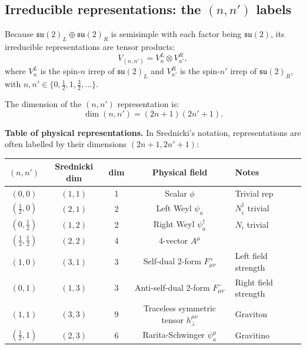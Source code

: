 \documentclass[12pt]{article}
\theoremstyle{remark}
\newcommand{\psidag}{\psi^{\dagger}}
\begin{document}
\subsection{Irreducible representations: the \texorpdfstring{$(n,n')$}{(n,n')} labels}

Because $\mathfrak{su}(2)_L \oplus \mathfrak{su}(2)_R$ is semisimple with
each factor being $\mathfrak{su}(2)$, its irreducible representations
are tensor products:
\begin{equation}
  V_{(n,n')} = V_n^L \otimes V_{n'}^R,
\end{equation}
where $V_n^L$ is the spin-$n$ irrep of $\mathfrak{su}(2)_L$ and
$V_{n'}^R$ is the spin-$n'$ irrep of $\mathfrak{su}(2)_R$,
with $n,n' \in \{0, \tfrac{1}{2}, 1, \tfrac{3}{2}, \ldots\}$.

The dimension of the $(n,n')$ representation is:
\begin{equation}
  \dim(n,n') = (2n+1)(2n'+1).
\end{equation}

\medskip
\noindent\textbf{Table of physical representations.}  In Srednicki's
notation, representations are often labelled by their dimensions
$(2n+1, 2n'+1)$:

\begin{center}
\renewcommand{\arraystretch}{1.45}
\begin{tabular}{@{}ccccl@{}}
  \toprule
  $(n,n')$ & Srednicki dim & dim & Physical field & Notes \\
  \midrule
  $(0,0)$ & $(1,1)$ & 1 & Scalar $\phi$ & Trivial rep \\
  $(\tfrac{1}{2},0)$ & $(2,1)$ & 2 & Left Weyl $\psi_a$ & $N_i^\dagger$ trivial \\
  $(0,\tfrac{1}{2})$ & $(1,2)$ & 2 & Right Weyl $\psidag_{\dot a}$ & $N_i$ trivial \\
  $(\tfrac{1}{2},\tfrac{1}{2})$ & $(2,2)$ & 4 & 4-vector $A^\mu$ & \\
  $(1,0)$ & $(3,1)$ & 3 & Self-dual 2-form $F^+_{\mu\nu}$ & Left field strength \\
  $(0,1)$ & $(1,3)$ & 3 & Anti-self-dual 2-form $F^-_{\mu\nu}$ & Right field strength \\
  $(1,1)$ & $(3,3)$ & 9 & Traceless symmetric tensor $h^{\mu\nu}_\perp$ & Graviton \\
  $(\tfrac{1}{2},1)$ & $(2,3)$ & 6 & Rarita-Schwinger $\psi^\mu_a$ & Gravitino \\
  \bottomrule
\end{tabular}
\end{center}
\end{document}
